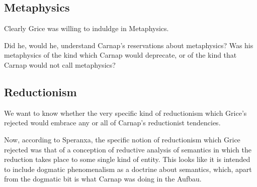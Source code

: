 \documentclass{article}
\begin{document}
\subsection{Metaphysics}

Clearly Grice was willing to induldge in Metaphysics.

Did he, would he, understand Carnap's reservations about metaphysics?
Was his metaphysics of the kind which Carnap would deprecate, or of the kind that Carnap would not call metaphysics?

\subsection{Reductionism}

We want to know whether the very specific kind of reductionism which Grice's rejected would embrace any or all of Carnap's reductionist tendencies.

Now, according to Speranxa, the specific notion of reductionism which Grice rejected was that of a conception of reductive analysis of semantics in which the reduction takes place to some single kind of entity.
This looks like it is intended to include dogmatic phenomenalism as a doctrine about semantics, which, apart from the dogmatic bit is what Carnap was doing in the Aufbau.



{\raggedright


} %
\end{document}
